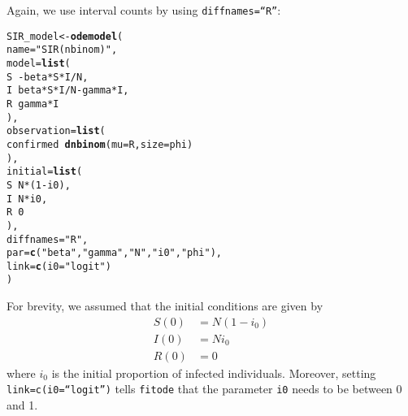 \documentclass{article}\usepackage[]{graphicx}\usepackage[]{color}
\makeatletter
\newcommand{\hlnum}[1]{\textcolor[rgb]{0.686,0.059,0.569}{#1}}%
\newcommand{\hlstr}[1]{\textcolor[rgb]{0.192,0.494,0.8}{#1}}%
\newcommand{\hlopt}[1]{\textcolor[rgb]{0,0,0}{#1}}%
\newcommand{\hlstd}[1]{\textcolor[rgb]{0.345,0.345,0.345}{#1}}%
\newcommand{\hlkwb}[1]{\textcolor[rgb]{0.69,0.353,0.396}{#1}}%
\newcommand{\hlkwc}[1]{\textcolor[rgb]{0.333,0.667,0.333}{#1}}%
\newcommand{\hlkwd}[1]{\textcolor[rgb]{0.737,0.353,0.396}{\textbf{#1}}}%
\newenvironment{kframe}{%
 \def\at@end@of@kframe{}%
 \ifinner\ifhmode%
  \def\at@end@of@kframe{\end{minipage}}%
  \begin{minipage}{\columnwidth}%
 \fi\fi%
 \def\FrameCommand##1{\hskip\@totalleftmargin \hskip-\fboxsep
 \colorbox{shadecolor}{##1}\hskip-\fboxsep
     \hskip-\linewidth \hskip-\@totalleftmargin \hskip\columnwidth}%
 \MakeFramed {\advance\hsize-\width
   \@totalleftmargin\z@ \linewidth\hsize
   \@setminipage}}%
 {\par\unskip\endMakeFramed%
 \at@end@of@kframe}
\newenvironment{knitrout}{}{} %
\makeatother
\begin{document}
Again, we use interval counts by using \texttt{diffnames=``R''}:
\begin{knitrout}
\color{fgcolor}\begin{kframe}
\begin{alltt}
\hlstd{SIR_model} \hlkwb{<-} \hlkwd{odemodel}\hlstd{(}
    \hlkwc{name}\hlstd{=}\hlstr{"SIR (nbinom)"}\hlstd{,}
    \hlkwc{model}\hlstd{=}\hlkwd{list}\hlstd{(}
        \hlstd{S} \hlopt{~ -} \hlstd{beta} \hlopt{*} \hlstd{S} \hlopt{*} \hlstd{I}\hlopt{/}\hlstd{N,}
        \hlstd{I} \hlopt{~} \hlstd{beta} \hlopt{*} \hlstd{S} \hlopt{*} \hlstd{I}\hlopt{/}\hlstd{N} \hlopt{-} \hlstd{gamma} \hlopt{*} \hlstd{I,}
        \hlstd{R} \hlopt{~} \hlstd{gamma} \hlopt{*} \hlstd{I}
    \hlstd{),}
    \hlkwc{observation}\hlstd{=}\hlkwd{list}\hlstd{(}
        \hlstd{confirmed} \hlopt{~} \hlkwd{dnbinom}\hlstd{(}\hlkwc{mu}\hlstd{=R,} \hlkwc{size}\hlstd{=phi)}
    \hlstd{),}
    \hlkwc{initial}\hlstd{=}\hlkwd{list}\hlstd{(}
        \hlstd{S} \hlopt{~} \hlstd{N} \hlopt{*} \hlstd{(}\hlnum{1} \hlopt{-} \hlstd{i0),}
        \hlstd{I} \hlopt{~} \hlstd{N} \hlopt{*} \hlstd{i0,}
        \hlstd{R} \hlopt{~} \hlnum{0}
    \hlstd{),}
    \hlkwc{diffnames}\hlstd{=}\hlstr{"R"}\hlstd{,}
    \hlkwc{par}\hlstd{=}\hlkwd{c}\hlstd{(}\hlstr{"beta"}\hlstd{,} \hlstr{"gamma"}\hlstd{,} \hlstr{"N"}\hlstd{,} \hlstr{"i0"}\hlstd{,} \hlstr{"phi"}\hlstd{),}
    \hlkwc{link}\hlstd{=}\hlkwd{c}\hlstd{(}\hlkwc{i0}\hlstd{=}\hlstr{"logit"}\hlstd{)}
\hlstd{)}
\end{alltt}
\end{kframe}
\end{knitrout}
For brevity, we assumed that the initial conditions are given by
\begin{equation}
\begin{aligned}
S(0) &= N (1 - i_0)\\
I(0) &= N i_0\\
R(0) &= 0
\end{aligned}
\end{equation}
where $i_0$ is the initial proportion of infected individuals.
Moreover, setting \texttt{link=c(i0=``logit'')} tells \texttt{fitode} that the
parameter \texttt{i0} needs to be between 0 and 1.
\end{document}
